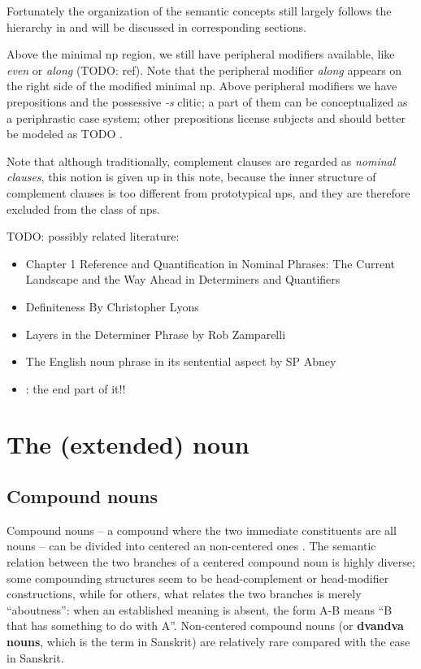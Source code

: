 \documentclass[UTF8, a4paper, oneside, scheme=plain, 12pt]{ctexbook}
\newcommand*{\citepages}[1]{pp.~{#1}}
\newcommand*{\concept}[1]{\textbf{#1}}
\newcommand*{\term}[1]{\emph{#1}}
\newcommand{\form}[1]{\emph{#1}}
\begin{document}
Fortunately the organization of the semantic concepts still largely follows 
the hierarchy in  
and will be discussed in corresponding sections.

Above the minimal \acs{np} region, 
we still have peripheral modifiers available, 
like \form{even} or \form{along} (TODO: ref).
Note that the peripheral modifier \form{along} appears 
on the right side of the modified minimal \acs{np}.
Above peripheral modifiers 
we have prepositions and the possessive \form{-s} clitic;
a part of them can be conceptualized as 
a periphrastic case system;
other prepositions license subjects
and should better be modeled as TODO .

Note that although traditionally, complement clauses are regarded as \term{nominal clauses},
this notion is given up in this note,
because the inner structure of complement clauses is too different from prototypical \acs{np}s,
and they are therefore excluded from the class of \acs{np}s.

TODO: possibly related literature: 
\begin{itemize}
    \item Chapter 1 Reference and Quantification in Nominal Phrases: The Current Landscape and the Way Ahead in Determiners and Quantifiers
    \item Definiteness By Christopher Lyons
    \item Layers in the Determiner Phrase by Rob Zamparelli
    \item The English noun phrase in its sentential aspect by SP Abney
    \item \citet{laenzlinger2017view}: the end part of it!!
\end{itemize}


\section{The (extended) noun}\label{sec:np.head}

\subsection{Compound nouns}\label{sec:pos.noun.compound}

Compound nouns -- a compound where the two immediate constituents are all nouns -- 
can be divided into centered an non-centered ones
\citep[\citepages{1646-1648}]{cgel}.
The semantic relation between the two branches of a centered compound noun
is highly diverse; 
some compounding structures seem to be head-complement or head-modifier constructions,
while for others, what relates the two branches is merely ``aboutness'':
when an established meaning is absent,
the form A-B means ``B that has something to do with A''.
Non-centered compound nouns 
(or \concept{dvandva nouns}, which is the term in Sanskrit) 
are relatively rare
compared with the case in Sanskrit.
\end{document}
